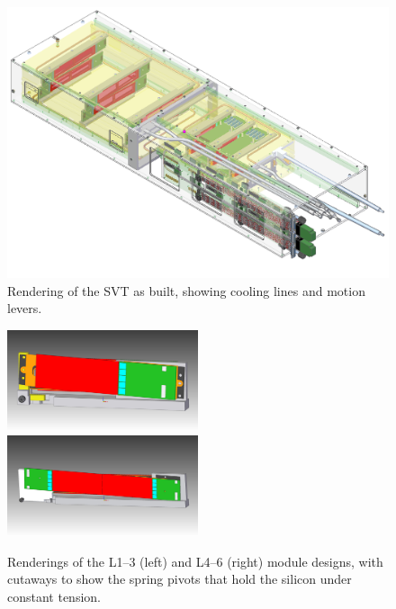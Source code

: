 \begin{figure}[ht]
    \includegraphics[width=\textwidth]{detector/figs/svt_drawing}
    \caption{Rendering of the SVT as built, showing cooling lines and motion levers.}
    \label{fig:svt-drawing}
\end{figure}

\begin{figure}[ht]
    \includegraphics[width=0.5\textwidth]{detector/figs/svt_l123_drawing}
    \includegraphics[width=0.5\textwidth]{detector/figs/svt_l456_drawing}
    \caption{Renderings of the L1--3 (left) and L4--6 (right) module designs, with cutaways to show the spring pivots that hold the silicon under constant tension.}
    \label{fig:svt-module-drawing}
\end{figure}

